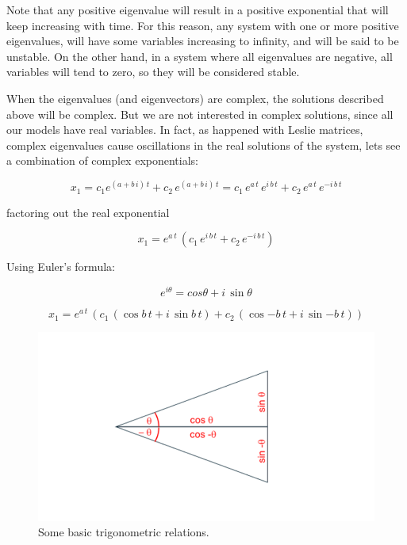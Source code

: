 \documentclass{tufte-book} %
\begin{document}
Note that any positive eigenvalue will result in a positive exponential that will keep increasing with time. For this reason, any system with one or more positive eigenvalues, will have some variables increasing to infinity, and will be said to be unstable. On the other hand, in a system where all eigenvalues are negative, all variables will tend to zero, so they will be considered stable.


When the eigenvalues (and eigenvectors) are complex, the solutions described above will be complex. But we are not interested in complex solutions, since all our models have real variables. In fact, as happened with Leslie matrices, complex eigenvalues cause oscillations in the real solutions of the system, lets see a combination of complex exponentials:

\begin{equation}
	x_1= c_1 e^{\left(  a + b\, i\right) \, t} + c_2 \,  e^{\left(  a + b\, i\right)\, t} = 
	c_1  \, e^{a \, t} \, e^{ i \, b \, t} + c_2 \,  e^{a \, t} \, e^{-i \, b \, t} 
	\nonumber
\end{equation}

factoring out the real exponential

\begin{equation}
x_1= e^{a \, t} \,  \left( c_1  \, e^{ i \, b \, t} + c_2 \,  e^{-i \, b \, t}\right) \nonumber
\end{equation}

Using Euler's formula:

\begin{equation}
	\label{euler}
	e^{i \theta} = cos \theta + i \, \sin \theta 
\end{equation}

\begin{equation}
	x_1= e^{a \, t} \,  \left( c_1  \, \left(  \cos{ b \, t} + i \, \sin{ b \, t} \right)+ c_2 \, \left( \cos{- b \, t} + i \, \sin{- b \, t} \right) \right) \nonumber
\end{equation}

\begin{figure}
\begin{center}
	\includegraphics[width=\textwidth]{trigo}
\end{center}
\caption{Some basic trigonometric relations.}
\label{fig:trigo}
\end{figure}
\end{document}
